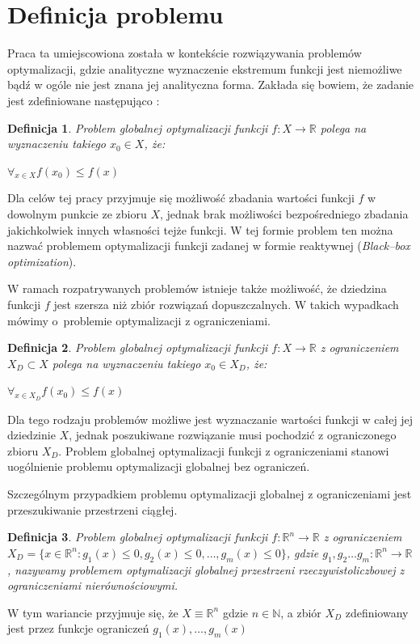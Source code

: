 \documentclass[12pt,a4paper]{report}
\begin{document}
\section{Definicja problemu}
\label{ProblemDefinition}
\par{
Praca ta umiejscowiona została w kontekście rozwiązywania problemów optymalizacji, gdzie analityczne wyznaczenie ekstremum funkcji jest niemożliwe bądź w ogóle nie jest znana jej analityczna forma. Zakłada się bowiem, że zadanie jest zdefiniowane następująco \cite{StrojnowskiOptymalizacja2}:
}
\newtheorem{OptDefinition}{Definicja}
\par{
\begin{OptDefinition}
Problem globalnej optymalizacji funkcji $f: X \rightarrow \mathbb{R}$ polega na wyznaczeniu takiego $x_0 \in X$, że:
\begin{center}
	$\forall_{x \in X} f(x_0) \leq f(x)$
\end{center}
\end{OptDefinition}
\par{
Dla celów tej pracy przyjmuje się możliwość zbadania wartości funkcji $f$ w dowolnym punkcie ze zbioru $X$, jednak brak możliwości bezpośredniego zbadania jakichkolwiek innych własności tejże funkcji. W tej formie problem ten można nazwać problemem optymalizacji funkcji zadanej w formie reaktywnej (\emph{Black--box optimization}).
}
\par{
W ramach rozpatrywanych problemów istnieje także możliwość, że dziedzina funkcji $f$ jest szersza niż zbiór rozwiązań dopuszczalnych. W takich wypadkach mówimy o~problemie optymalizacji z ograniczeniami.
\begin{OptDefinition}
Problem globalnej optymalizacji funkcji $f: X \rightarrow \mathbb{R}$ z ograniczeniem $X_D \subset X$ polega na wyznaczeniu takiego $x_0 \in X_D$, że:
\begin{center}
	$\forall_{x \in X_D} f(x_0) \leq f(x)$
\end{center}
\end{OptDefinition}
Dla tego rodzaju problemów możliwe jest wyznaczanie wartości funkcji w całej jej dziedzinie $X$, jednak poszukiwane rozwiązanie musi pochodzić z ograniczonego zbioru $X_D$.
Problem globalnej optymalizacji funkcji z ograniczeniami stanowi uogólnienie problemu optymalizacji globalnej bez ograniczeń.
}
\par{
Szczególnym przypadkiem problemu optymalizacji globalnej z ograniczeniami jest przeszukiwanie przestrzeni ciągłej. 
\begin{OptDefinition}
Problem globalnej optymalizacji funkcji $f: \mathbb{R}^n \rightarrow \mathbb{R}$ z ograniczeniem $X_D = \{x \in \mathbb{R}^n: g_1(x) \leq 0, g_2(x) \leq 0, \ldots, g_m(x) \leq 0\}$, gdzie $g_1, g_2 \ldots g_m: \mathbb{R}^n \rightarrow \mathbb{R}$, nazywamy problemem optymalizacji globalnej przestrzeni rzeczywistoliczbowej z ograniczeniami nierównościowymi.
\end{OptDefinition}
W tym wariancie przyjmuje się, że $X \equiv \mathbb{R}^n$ gdzie $n \in \mathbb{N}$, a zbiór $X_D$ zdefiniowany jest przez funkcje ograniczeń $g_1(x), \ldots, g_m(x)$
}

}
\end{document}
